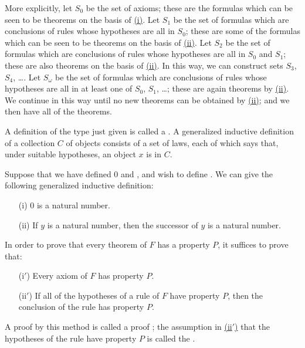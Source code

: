 More explicitly, let $S_0$ be the set of axioms; these are the formulas which can be seen to be theorems on the basis of \hyperref[axioms are theorems]{(i)}.
Let $S_1$ be the set of formulas which are conclusions of rules whose hypotheses are all in $S_0$; these are some of the formulas which can be seen to be theorems on the basis of \hyperref[inductions are theorems]{(ii)}.
Let $S_2$ be the set of formulas which are conclusions of rules whose hypotheses are all in $S_0$ and $S_1$; these are also theorems on the basis of \hyperref[inductions are theorems]{(ii)}.
In this way, we can construct sets $S_3$, $S_4$, \ldots.
Let $S_\omega$ be the set of formulas which are conclusions of rules whose hypotheses are all in at least one of $S_0$, $S_1$, \ldots; these are again theorems by \hyperref[inductions are theorems]{(ii)}.
We continue in this way until no new theorems can be obtained by \hyperref[inductions are theorems]{(ii)}; and we then have all of the theorems.

A definition of the type just given is called a .
A generalized inductive definition of a collection $C$ of objects consists of a set of laws, each of which says that, under suitable hypotheses, an object $x$ is in $C$.

\begin{example}
Suppose that we have defined 0 and , and wish to define .
We can give the following generalized inductive definition:
\begin{enumerate}
    \item[(i)] 0 is a natural number.
    \item[(ii)] If $y$ is a natural number, then the successor of $y$ is a natural number.
\end{enumerate}
\end{example}

In order to prove that every theorem of $F$ has a property $P$, it suffices to prove that:
\begin{enumerate}
    \item[(i$'$)] Every axiom of $F$ has property $P$.
    \item[(ii$'$)\label{induction hypothesis}] If all of the hypotheses of a rule of $F$ have property $P$, then the conclusion of the rule has property $P$.
\end{enumerate}

\begin{remark}
A proof by this method is called a proof ;
the assumption in \hyperref[induction hypothesis]{(ii$'$)} that the hypotheses of the rule have property $P$ is called the .
\end{remark}

